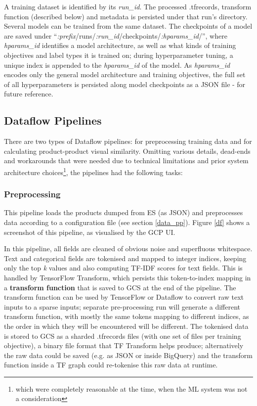 A training dataset is identified by its \textit{run\_id}.
The processed .tfrecords, transform function (described below) and metadata is persisted under that run's directory.
Several models can be trained from the same dataset.
The checkpoints of a model are saved under ``\textit{:prefix}/runs/\textit{:run\_id}/checkpoints/\textit{:hparams\_id}/'', where \textit{hparams\_id} identifies a model architecture, as well as what kinds of training objectives and label types it is trained on; during hyperparameter tuning, a unique index is appended to the \textit{hparams\_id} of the model.
As \textit{hparams\_id} encodes only the general model architecture and training objectives, the full set of all hyperparameters is persisted along model checkpoints as a JSON file - for future reference.

\subsection{Dataflow Pipelines}
There are two types of Dataflow pipelines: for preprocessing training data and for calculating product-product visual similarity. Omitting various details, dead-ends and workarounds that were needed due to technical limitations and prior system architecture choices\footnote{which were completely reasonable at the time, when the ML system was not a consideration}, the pipelines had the following tasks:

\subsubsection{Preprocessing}
\label{pp}

This pipeline loads the products dumped from ES (as JSON) and preprocesses data according to a configuration file (see section \ref{data_pp}).
Figure \ref{df} shows a screenshot of this pipeline, as visualised by the GCP UI.

In this pipeline, all fields are cleaned of obvious noise and superfluous whitespace.
Text and categorical fields are tokenised and mapped to integer indices, keeping only the top \textit{k} values and also computing TF-IDF scores for text fields.
This is handled by TensorFlow Transform, which persists this token-to-index mapping in a \textbf{transform function} that is saved to GCS at the end of the pipeline.
The transform function can be used by TensorFlow or Dataflow to convert raw text inputs to a  sparse inputs;
separate pre-processing run will generate a different transform function, with mostly the same tokens mapping to different indices, as the order in which they will be encountered will be different.
The tokenised data is stored to GCS as a sharded .tfrecords files (with one set of files per training objective), a binary file format that TF Transform helps produce; alternatively the raw data could be saved (e.g. as JSON or inside BigQuery) and the transform function inside a TF graph could re-tokenise this raw data at runtime.


